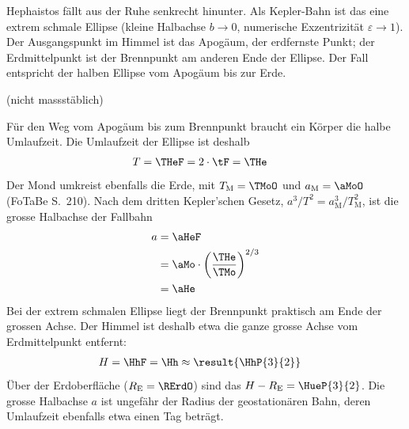 \begin{abcliste}
\abc Hephaistos fällt aus der Ruhe senkrecht hinunter. Als Kepler-Bahn ist das eine extrem schmale Ellipse (kleine Halbachse $b \to 0$, numerische Exzentrizität $\varepsilon \to 1$). Der Ausgangspunkt im Himmel ist das Apogäum, der erdfernste Punkt; der Erdmittelpunkt ist der Brennpunkt am anderen Ende der Ellipse. Der Fall entspricht der halben Ellipse vom Apogäum bis zur Erde.

\begin{center}

(nicht massstäblich)
\end{center}

\abc Für den Weg vom Apogäum bis zum Brennpunkt braucht ein Körper die halbe Umlaufzeit. Die Umlaufzeit der Ellipse ist deshalb
\begin{align}
 T &= \THeF = 2\cdot\tF = \THe
\end{align}
Der Mond umkreist ebenfalls die Erde, mit $T_\text{M} = \TMoO$ und $a_\text{M} = \aMoO$ (FoTaBe S.~210). Nach dem dritten Kepler'schen Gesetz, $a^3/T^2 = a_\text{M}^3/T_\text{M}^2$, ist die grosse Halbachse der Fallbahn
\begin{align}
 a &= \aHeF \\
   &= \aMo\cdot\left(\frac{\THe}{\TMo}\right)^{2/3} \\
   &= \aHe
\end{align}
Bei der extrem schmalen Ellipse liegt der Brennpunkt praktisch am Ende der grossen Achse. Der Himmel ist deshalb etwa die ganze grosse Achse vom Erdmittelpunkt entfernt:
\begin{align}
 H &= \HhF = \Hh \approx \result{\HhP{3}{2}}
\end{align}
Über der Erdoberfläche ($R_\text{E} = \RErdO$) sind das $H - R_\text{E} = \HueP{3}{2}$. Die grosse Halbachse $a$ ist ungefähr der Radius der geostationären Bahn, deren Umlaufzeit ebenfalls etwa einen Tag beträgt.
\end{abcliste}
